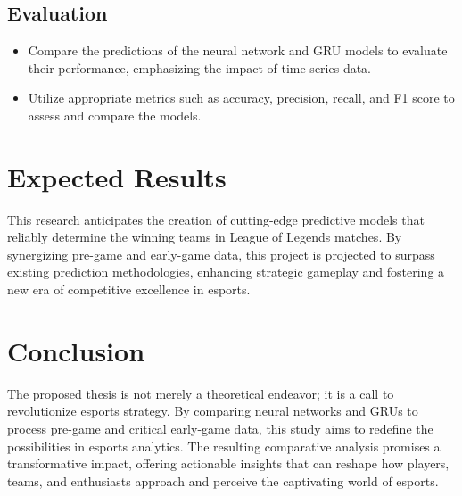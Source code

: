 \documentclass{article}
\begin{document}
\subsection{Evaluation}
\begin{itemize}
  \item Compare the predictions of the neural network and GRU models to evaluate their performance, emphasizing the impact of time series data.
  \item Utilize appropriate metrics such as accuracy, precision, recall, and F1 score to assess and compare the models.
\end{itemize}

\section{Expected Results}
This research anticipates the creation of cutting-edge predictive models that reliably determine the winning teams in League of Legends matches. By synergizing pre-game and early-game data, this project is projected to surpass existing prediction methodologies, enhancing strategic gameplay and fostering a new era of competitive excellence in esports.

\section{Conclusion}
The proposed thesis is not merely a theoretical endeavor; it is a call to revolutionize esports strategy. By comparing neural networks and GRUs to process pre-game and critical early-game data, this study aims to redefine the possibilities in esports analytics. The resulting comparative analysis promises a transformative impact, offering actionable insights that can reshape how players, teams, and enthusiasts approach and perceive the captivating world of esports.
\end{document}
